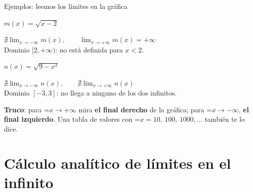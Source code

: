 \documentclass[11pt,a4paper]{article}
\newcommand{\fmm}[1]{\setbox0=\hbox{$#1$}\ifdim\wd0>\linewidth\fmdisp{#1}\else\mbox{\box0}\fi}
\newcommand{\fmdisp}[1]{\[\setbox2=\hbox{$\displaystyle #1$}\ifdim\wd2>\linewidth\resizebox{\linewidth}{!}{\box2}\else\box2\fi\]}
\newcommand{\fmuline}[1]{\textbf{\color{fmaccent}#1}}
\begin{document}
\begin{fmexfill}{Ejemplos: leemos los límites en la gráfica}
\begin{minipage}[t][\tcbtextheight][s]{\linewidth}
\noindent \begin{minipage}[t]{0.48\linewidth}\centering $m(x)=\sqrt{x-2}$\par\smallskip {}\par\smallskip $\displaystyle\nexists\lim_{x\to-\infty}m(x),\qquad\lim_{x\to+\infty}m(x)=+\infty$\\ \vspace*{0.2cm} Dominio $[2,+\infty)$: no está definida para $x<2$.\end{minipage}\hfill\begin{minipage}[t]{0.48\linewidth}\centering $n(x)=\sqrt{9-x^2}$\par\smallskip {}\par\smallskip $\displaystyle\nexists\lim_{x\to-\infty}n(x),\qquad\nexists\lim_{x\to+\infty}n(x)$\\ \vspace*{0.2cm} Dominio $[-3,3]$: no llega a ninguno de los dos infinitos.\end{minipage}\par
\vfill

      
\begin{fmnote}\fmuline{Truco}: para \fmm{x\to+\infty} mira \textbf{el final derecho} de la gráfica; para \fmm{x\to-\infty}, \textbf{el final izquierdo}. Una tabla de valores con \fmm{x=10,\ 100,\ 1000,\dots} también te lo dice.\end{fmnote}
\end{minipage}
\end{fmexfill}

\section{Cálculo analítico de límites en el infinito}\hypertarget{sec2}{}
\end{document}
